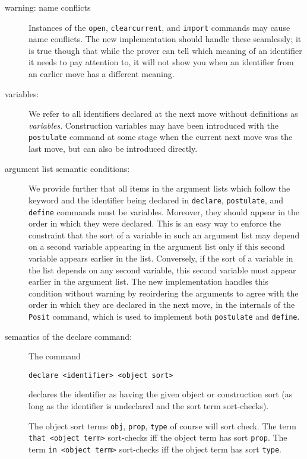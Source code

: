 \documentclass[12pt]{article}
\begin{document}
\begin{description}
\item[warning:  name conflicts]  Instances of the {\tt open}, {\tt clearcurrent}, and {\tt import} commands may cause name conflicts.   The new implementation should handle these seamlessly;  it is true though that while the prover can tell which meaning of an identifier it needs to pay attention to, it will not show you when an identifier from an earlier move has a different meaning.

\item[variables:]  We refer to all identifiers declared at the next move without definitions as {\em variables\/}.  Construction variables may have been introduced with the {\tt postulate} command at some stage when the current next move was the last move, but can also be introduced directly.

\item[argument list semantic conditions:]  We provide further that all items in the argument lists which follow the keyword and the identifier being declared in {\tt declare}, {\tt postulate}, and {\tt define} commands
must be variables.  Moreover, they should appear in the order in which they were declared.  This is an easy way to enforce the constraint that the sort of a variable in such an
argument list may depend on a second variable appearing in the argument list only if this second variable appears earlier in the list.   Conversely, if the sort of a variable in the list depends
on any second variable, this second variable must appear earlier in the argument list.   The new implementation handles this condition without warning by reoirdering the arguments to agree with the order in which they are declared in the next move, in the internals of the {\tt Posit} command, which is used to implement both {\tt postulate} and {\tt define}.

\item[semantics of the declare command:]  The command \begin{center}{\tt declare <identifier> <object sort>}\end{center}  declares the identifier as having the given object or construction sort (as long as the identifier is undeclared and the sort term sort-checks).

The object sort terms {\tt obj}, {\tt prop}, {\tt type} of course will sort check.  The term {\tt that <object term>} sort-checks iff the object term has sort {\tt prop}.   The term {\tt in <object term>} sort-checks iff the object term has sort {\tt type}.   


\end{description}
\end{document}
